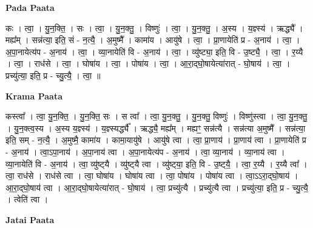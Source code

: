 \documentclass[17pt]{extarticle}
\begin{document}
\textbf{Pada Paata} \newline

कः । त्वा॒ । यु॒न॒क्ति॒ । सः । त्वा॒ । यु॒न॒क्तु॒ । विष्णुः॑ । त्वा॒ । यु॒न॒क्तु॒ । अ॒स्य । य॒ज्ञ्स्य॑ । ऋद्ध्यै᳚ । मह्य᳚म् । सन्न॑त्या॒ इति॒ सं - न॒त्यै॒ । अ॒मुष्मै᳚ । कामा॑य । आयु॑षे । त्वा॒ । प्रा॒णायेति॑ प्र - अ॒नाय॑ । त्वा॒ । अ॒पा॒नायेत्य॑प - अ॒नाय॑ । त्वा॒ । व्या॒नायेति॑ वि - अ॒नाय॑ । त्वा॒ । व्यु॑ष्ट्या॒ इति॒ वि - उ॒ष्ट्यै॒ । त्वा॒ । र॒य्यै । त्वा॒ । राध॑से । त्वा॒ । घोषा॑य । त्वा॒ । पोषा॑य । त्वा॒ । आ॒रा॒द्घो॒षायेत्या॑रात् - घो॒षाय॑ । त्वा॒ । प्रच्यु॑त्या॒ इति॒ प्र - च्यु॒त्यै॒ । त्वा॒ ॥  \newline


\textbf{Krama Paata} \newline

कस्त्वा᳚ । त्वा॒ यु॒न॒क्ति॒ । यु॒न॒क्ति॒ सः । स त्वा᳚ । त्वा॒ यु॒न॒क्तु॒ । यु॒न॒क्तु॒ विष्णुः॑ । विष्णु॑स्त्वा । त्वा॒ यु॒न॒क्तु॒ । यु॒न॒क्त्व॒स्य । अ॒स्य य॒ज्ञ्स्य॑ । य॒ज्ञ्स्यर्द्ध्यै᳚ । ऋद्ध्यै॒ मह्य᳚म् । मह्यꣳ॒॒ सन्न॑त्यै । सन्न॑त्या अ॒मुष्मै᳚ । सन्न॑त्या॒ इति॒ सम् - न॒त्यै॒ । अ॒मुष्मै॒ कामा॑य । कामा॒यायु॑षे । आयु॑षे त्वा । त्वा॒ प्रा॒णाय॑ । प्रा॒णाय॑ त्वा । प्रा॒णायेति॑ प्र - अ॒नाय॑ । त्वा॒ऽपा॒नाय॑ । अ॒पा॒नाय॑ त्वा । अ॒पा॒नायेत्य॑प - अ॒नाय॑ । त्वा॒ व्या॒नाय॑ । व्या॒नाय॑ त्वा । व्या॒नायेति॑ वि - अ॒नाय॑ । त्वा॒ व्यु॑ष्ट्‍यै । व्यु॑ष्ट्‍यै त्वा । व्यु॑ष्ट्‍या॒ इति॒ वि - उ॒ष्ट्‍यै॒ । त्वा॒ र॒य्यै । र॒य्यै त्वा᳚ । त्वा॒ राध॑से । राध॑से त्वा । त्वा॒ घोषा॑य । घोषा॑य त्वा । त्वा॒ पोषा॑य । पोषा॑य त्वा । त्वा॒ऽऽरा॒द्‍घो॒षाय॑ । आ॒रा॒द्‍घो॒षाय॑ त्वा । आ॒रा॒द्‍घो॒षायेत्या॑रात् - घो॒षाय॑ । त्वा॒ प्रच्यु॑त्यै । प्रच्यु॑त्यै त्वा । प्रच्यु॑त्या॒ इति॒ प्र - च्यु॒त्यै॒ । त्वेति॑ त्वा । \newline

\textbf{Jatai Paata} \newline
\end{document}
